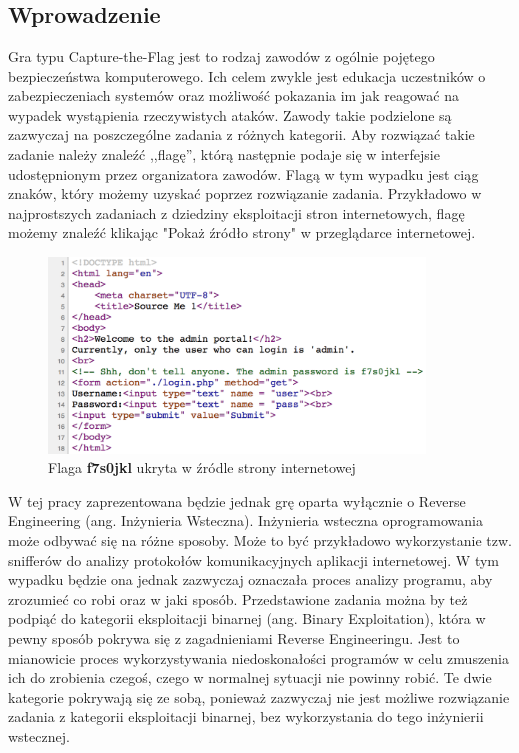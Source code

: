 \documentclass[polish,12pt]{aghthesis}
\author{Piotr Szczygieł}
\date{\the\year}
\begin{document}
\maketitle

\tableofcontents
\newpage

\section{\SectionTitleProjectVision}
\label{sec:cel-wizja}

\subsection{Wprowadzenie}

Gra typu Capture-the-Flag jest to rodzaj zawodów z ogólnie pojętego
bezpieczeństwa komputerowego. Ich celem zwykle jest edukacja uczestników
o zabezpieczeniach systemów oraz możliwość pokazania im jak reagować
na wypadek wystąpienia rzeczywistych ataków. Zawody takie podzielone są zazwyczaj
na poszczególne zadania z różnych kategorii. Aby rozwiązać takie zadanie należy
znaleźć ,,flagę'', którą następnie podaje się w interfejsie udostępnionym przez
organizatora zawodów. Flagą w tym wypadku jest ciąg znaków, który możemy uzyskać
poprzez rozwiązanie zadania. Przykładowo w najprostszych zadaniach
z dziedziny eksploitacji stron internetowych, flagę możemy znaleźć klikając
"Pokaż źródło strony" w przeglądarce internetowej.

\begin{figure}[ht]
    \centering
    \includegraphics[width=10cm]{flag_page_source}
    \caption{Flaga \textbf{f7s0jkl} ukryta w źródle strony internetowej}
    \label{fig:flag_page_source}
\end{figure}

W tej pracy zaprezentowana będzie jednak grę oparta
wyłącznie o Reverse Engineering (ang. Inżynieria Wsteczna).
Inżynieria wsteczna oprogramowania może odbywać się na różne sposoby.
Może to być przykładowo wykorzystanie tzw. snifferów do analizy protokołów
komunikacyjnych aplikacji internetowej. W tym wypadku będzie ona jednak
zazwyczaj oznaczała proces analizy programu, aby zrozumieć co robi
oraz w jaki sposób. Przedstawione zadania można by też podpiąć do kategorii
eksploitacji binarnej (ang. Binary Exploitation), która w pewny sposób pokrywa
się z zagadnieniami Reverse Engineeringu. Jest to mianowicie proces
wykorzystywania niedoskonałości programów w celu zmuszenia ich do zrobienia
czegoś, czego w normalnej sytuacji nie powinny robić. Te dwie kategorie pokrywają
się ze sobą, ponieważ zazwyczaj nie jest możliwe rozwiązanie zadania z kategorii
eksploitacji binarnej, bez wykorzystania do tego inżynierii wstecznej. \pagebreak
\end{document}
